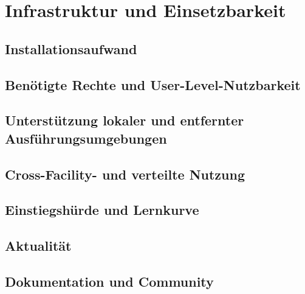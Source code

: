 \section{Infrastruktur und Einsetzbarkeit}
\label{sec:classification:infrastructure-usability}

\subsection{Installationsaufwand}
\label{sec:classification:installation-effort}

\subsection{Benötigte Rechte und User-Level-Nutzbarkeit}
\label{sec:classification:permissions-user-level}

\subsection{Unterstützung lokaler und entfernter Ausführungsumgebungen}
\label{sec:classification:local-cluster-hpc}

\subsection{Cross-Facility- und verteilte Nutzung}
\label{sec:classification:cross-facility-distributed}

\subsection{Einstiegshürde und Lernkurve}
\label{sec:classification:learning-curve}

\subsection{Aktualität}
\label{sec:classification:uptodateness}

\subsection{Dokumentation und Community}
\label{sec:classification:documentation/community}


